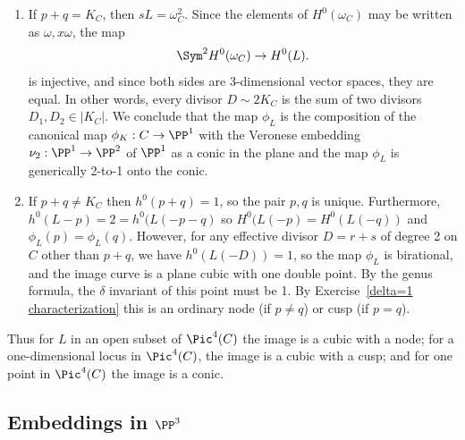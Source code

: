 \begin{enumerate}
\item If $p+q =  K_C$, then $sL = \omega_C^2$. Since
the elements of $H^0(\omega_C)$ may be written as $\omega, x\omega$, the map
$$
\Sym^2 H^0(\omega_C) \to H^0(L).
$$
 is injective, and since both sides are 3-dimensional vector spaces, they are equal. In other words, every divisor $D \sim 2K_C$ is the sum of two divisors $D_1, D_2 \in |K_C|$. We conclude that the map $\phi_L$ is the composition of the canonical map $\phi_K : C \to \PP^1$ with the Veronese embedding $\nu_2 : \PP^1 \to \PP^2$ of $\PP^1$ as a conic in the plane and the map $\phi_L$ is generically 2-to-1 onto the conic.

\item If $p+q \neq  K_C$  then $h^0(p+q) = 1$, so the pair $p,q$ is unique. Furthermore,
 $h^0(L-p) = 2 =  h^0(L(-p-q)$ so 
 $H^0(L(-p) = H^0(L(-q))$ and $\phi_L(p) = \phi_L(q)$. However, for any effective divisor $D = r+s$ of degree 2 on $C$  other than $p+q$, we have $h^0(L(-D)) = 1$, so the map $\phi_L$ is birational, and the image curve is a plane cubic with one double point.
By the genus formula, the $\delta$ invariant of this point must be 1. By Exercise~\ref{delta=1 characterization}
 this is an ordinary node (if $p\neq q$) or cusp (if $p=q$).

\end{enumerate}

Thus  for $L$ in an open subset of $\Pic^4(C)$ the image is a cubic with a node; for a one-dimensional locus in $\Pic^4(C)$, the image is a cubic with a cusp; and for one point in $\Pic^4(C)$ the image is a conic.
%
%

\subsection{Embeddings in $\PP^3$}

